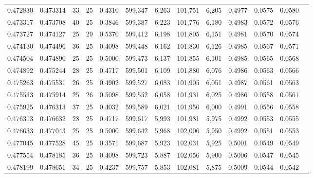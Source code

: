 \begin{tabular}{rrrrrrrrrrrrr}
0.472830 & 0.473314 &    33 &  25 &                                     0.4310 & 599,347 &   6,263 & 101,751 &   6,205 & 0.4977 & 0.0575 & 0.0580 \\
0.473317 & 0.473708 &    40 &  25 &                                     0.3846 & 599,387 &   6,223 & 101,776 &   6,180 & 0.4983 & 0.0572 & 0.0576 \\
0.473727 & 0.474127 &    25 &  29 &                                     0.5370 & 599,412 &   6,198 & 101,805 &   6,151 & 0.4981 & 0.0570 & 0.0574 \\
0.474130 & 0.474496 &    36 &  25 &                                     0.4098 & 599,448 &   6,162 & 101,830 &   6,126 & 0.4985 & 0.0567 & 0.0571 \\
0.474504 & 0.474890 &    25 &  25 &                                     0.5000 & 599,473 &   6,137 & 101,855 &   6,101 & 0.4985 & 0.0565 & 0.0568 \\
0.474892 & 0.475244 &    28 &  25 &                                     0.4717 & 599,501 &   6,109 & 101,880 &   6,076 & 0.4986 & 0.0563 & 0.0566 \\
0.475263 & 0.475531 &    26 &  25 &                                     0.4902 & 599,527 &   6,083 & 101,905 &   6,051 & 0.4987 & 0.0561 & 0.0563 \\
0.475533 & 0.475914 &    25 &  26 &                                     0.5098 & 599,552 &   6,058 & 101,931 &   6,025 & 0.4986 & 0.0558 & 0.0561 \\
0.475925 & 0.476313 &    37 &  25 &                                     0.4032 & 599,589 &   6,021 & 101,956 &   6,000 & 0.4991 & 0.0556 & 0.0558 \\
0.476313 & 0.476632 &    28 &  25 &                                     0.4717 & 599,617 &   5,993 & 101,981 &   5,975 & 0.4992 & 0.0553 & 0.0555 \\
0.476633 & 0.477043 &    25 &  25 &                                     0.5000 & 599,642 &   5,968 & 102,006 &   5,950 & 0.4992 & 0.0551 & 0.0553 \\
0.477045 & 0.477528 &    45 &  25 &                                     0.3571 & 599,687 &   5,923 & 102,031 &   5,925 & 0.5001 & 0.0549 & 0.0549 \\
0.477554 & 0.478185 &    36 &  25 &                                     0.4098 & 599,723 &   5,887 & 102,056 &   5,900 & 0.5006 & 0.0547 & 0.0545 \\
0.478199 & 0.478651 &    34 &  25 &                                     0.4237 & 599,757 &   5,853 & 102,081 &   5,875 & 0.5009 & 0.0544 & 0.0542 \\

\end{tabular}
